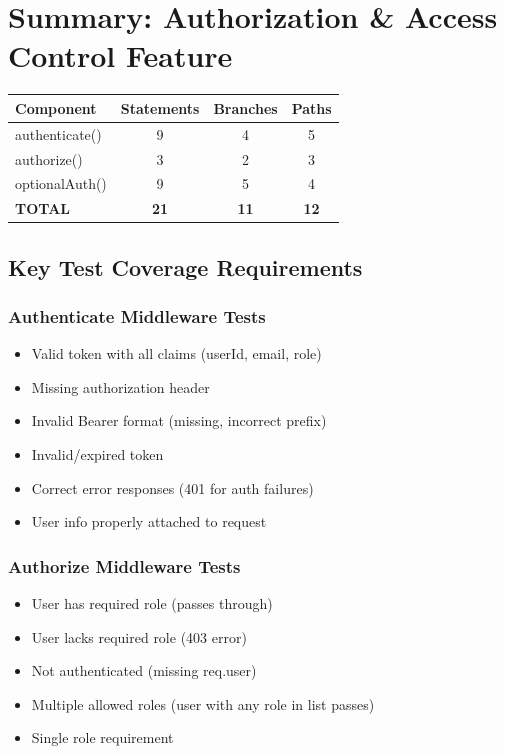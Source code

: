 \section{Summary: Authorization \& Access Control Feature}

\begin{longtable}{|l|c|c|c|}
\hline
\textbf{Component} & \textbf{Statements} & \textbf{Branches} & \textbf{Paths} \\
\hline
authenticate() & 9 & 4 & 5 \\
\hline
authorize() & 3 & 2 & 3 \\
\hline
optionalAuth() & 9 & 5 & 4 \\
\hline
\textbf{TOTAL} & \textbf{21} & \textbf{11} & \textbf{12} \\
\hline
\end{longtable}

\subsection{Key Test Coverage Requirements}

\subsubsection{Authenticate Middleware Tests}
\begin{itemize}
    \item Valid token with all claims (userId, email, role)
    \item Missing authorization header
    \item Invalid Bearer format (missing, incorrect prefix)
    \item Invalid/expired token
    \item Correct error responses (401 for auth failures)
    \item User info properly attached to request
\end{itemize}

\subsubsection{Authorize Middleware Tests}
\begin{itemize}
    \item User has required role (passes through)
    \item User lacks required role (403 error)
    \item Not authenticated (missing req.user)
    \item Multiple allowed roles (user with any role in list passes)
    \item Single role requirement
\end{itemize}


